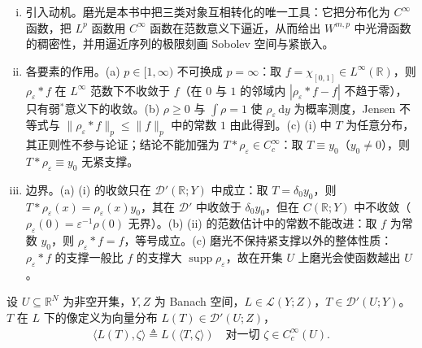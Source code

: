 \documentclass[../../main.tex]{subfiles}%
\begin{document}
\begin{remark}\label{remark:ch04-磨光逼近动机}
\begin{enumerate}[(i)]
\item 引入动机。磨光是本书中把三类对象互相转化的唯一工具：它把分布化为 $C^\infty$ 函数，把 $L^p$ 函数用 $C^\infty$ 函数在范数意义下逼近，从而给出 $W^{m,p}$ 中光滑函数的稠密性，并用逼近序列的极限刻画 Sobolev 空间与紧嵌入。

\item 各要素的作用。(a) $p\in[1,\infty)$ 不可换成 $p=\infty$：取 $f=\chi_{[0,1]}\in L^\infty(\mathbb{R})$，则 $\rho_\varepsilon*f$ 在 $L^\infty$ 范数下不收敛于 $f$（在 $0$ 与 $1$ 的邻域内 $|\rho_\varepsilon*f-f|$ 不趋于零），只有弱$^*$意义下的收敛。(b) $\rho\geqslant0$ 与 $\int\rho=1$ 使 $\rho_\varepsilon\,\mathrm{d}y$ 为概率测度，Jensen 不等式与 $\|\rho_\varepsilon*f\|_p\leqslant\|f\|_p$ 中的常数 $1$ 由此得到。(c) (i) 中 $T$ 为任意分布，其正则性不参与论证；结论不能加强为 $T*\rho_\varepsilon\in C_c^\infty$：取 $T\equiv y_0$（$y_0\neq0$），则 $T*\rho_\varepsilon\equiv y_0$ 无紧支撑。

\item 边界。(a) (i) 的收敛只在 $\mathcal{D}'(\mathbb{R};Y)$ 中成立：取 $T=\delta_0y_0$，则 $T*\rho_\varepsilon(x)=\rho_\varepsilon(x)y_0$，其在 $\mathcal{D}'$ 中收敛于 $\delta_0y_0$，但在 $C(\mathbb{R};Y)$ 中不收敛（$\rho_\varepsilon(0)=\varepsilon^{-1}\rho(0)$ 无界）。(b) (ii) 的范数估计中的常数不能改进：取 $f$ 为常数 $y_0$，则 $\rho_\varepsilon*f=f$，等号成立。(c) 磨光不保持紧支撑以外的整体性质：$\rho_\varepsilon*f$ 的支撑一般比 $f$ 的支撑大 $\operatorname{supp}\rho_\varepsilon$，故在开集 $U$ 上磨光会使函数越出 $U$。
\end{enumerate}
\end{remark}

\begin{definition}[分布的像]\label{definition:ch04-分布像}
设 $U\subseteq\mathbb{R}^N$ 为非空开集，$Y,Z$ 为 Banach 空间，$L\in\mathcal{L}(Y;Z)$，$T\in\mathcal{D}'(U;Y)$。$T$ 在 $L$ 下的像定义为向量分布 $L(T)\in\mathcal{D}'(U;Z)$，
\begin{align*}
\langle L(T),\zeta\rangle\triangleq L(\langle T,\zeta\rangle)\quad\text{对一切 }\zeta\in C_c^\infty(U).
\end{align*}
\end{definition}
\end{document}
